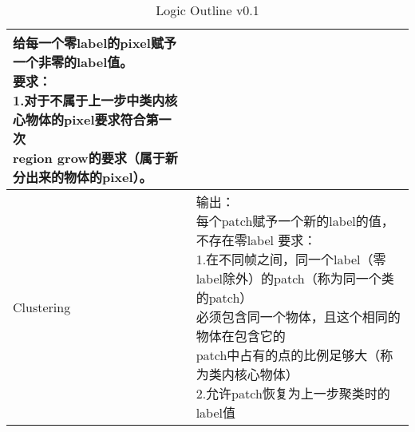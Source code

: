 \begin{table*}[!hbp]
\begin{tabular}{p{}|p{}}
{			给每一个零label的pixel赋予一个非零的label值。\\
			要求：\\
			1.对于不属于上一步中类内核心物体的pixel要求符合第一次\\region grow的要求（属于新分出来的物体的pixel）。}\\
		\hline
		Clustering&\tabincell{l}{输出：\\
			每个patch赋予一个新的label的值，不存在零label
			要求：\\
			1.在不同帧之间，同一个label（零label除外）的patch（称为同一个类的patch）\\必须包含同一个物体，且这个相同的物体在包含它的\\patch中占有的点的比例足够大（称为类内核心物体）\\
			2.允许patch恢复为上一步聚类时的label值}\\
		\hline
	\end{tabular}
	\caption{Logic Outline v0.1} %
	\label{tab:logic_outline01}
\end{table*}
